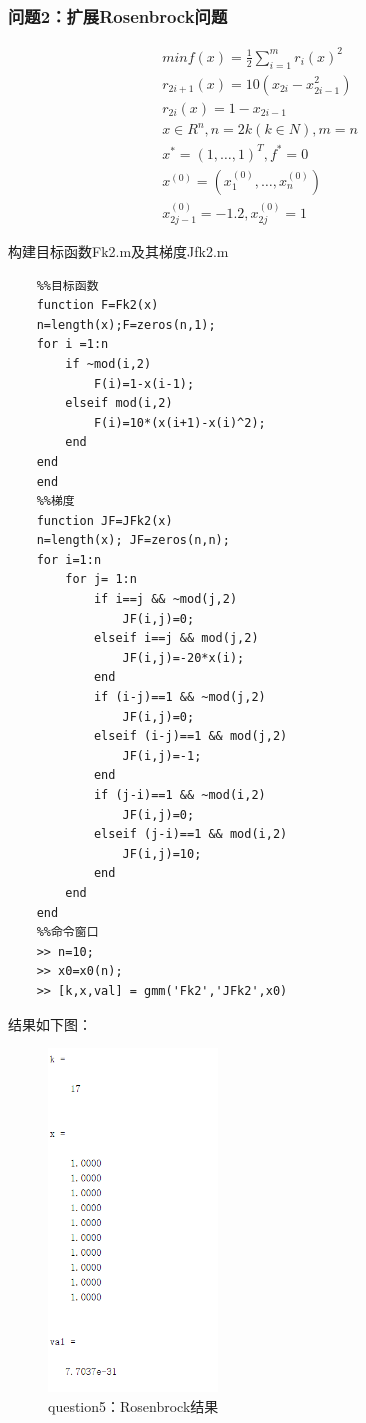\documentclass[12pt]{article} %
\begin{document}
	\subsubsection{问题2：扩展Rosenbrock问题}
	\begin{gather*}
	minf(x)=\frac{1}{2}\sum_{i=1}^{m} r_i(x)^2\\
	r_{2i+1}(x)=10(x_{2i}-x_{2i-1}^2)\\
	r_{2i}(x)=1-x_{2i-1}\\
	x\in R^n,n=2k(k\in N),m=n\\
	x^*=(1,\ldots,1)^T,f^*=0\\
	x^{(0)}=(x_1^{(0)},\ldots,x_n^{(0)})\\
	x_{2j-1}^{(0)}=-1.2,x_{2j}^{(0)}=1
	\end{gather*}
	
	构建目标函数Fk2.m及其梯度Jfk2.m
	\begin{lstlisting}
	%%目标函数
	function F=Fk2(x)
	n=length(x);F=zeros(n,1);
	for i =1:n
		if ~mod(i,2)
			F(i)=1-x(i-1);
		elseif mod(i,2)
			F(i)=10*(x(i+1)-x(i)^2);
		end
	end
	end
	%%梯度
	function JF=JFk2(x)
	n=length(x); JF=zeros(n,n);
	for i=1:n
		for j= 1:n
			if i==j && ~mod(j,2)
				JF(i,j)=0;
			elseif i==j && mod(j,2)
				JF(i,j)=-20*x(i);
			end
			if (i-j)==1 && ~mod(j,2)
				JF(i,j)=0;
			elseif (i-j)==1 && mod(j,2)
				JF(i,j)=-1;
			end
			if (j-i)==1 && ~mod(i,2)
				JF(i,j)=0;
			elseif (j-i)==1 && mod(i,2)
				JF(i,j)=10;
			end
		end
	end
	%%命令窗口
	>> n=10;
	>> x0=x0(n);
	>> [k,x,val] = gmm('Fk2','JFk2',x0)
	\end{lstlisting}
	
	结果如下图：
	\begin{figure}[ht]
		\centering
		\includegraphics[width=0.4\textwidth]{rosen.png}
		\caption{question5：Rosenbrock结果}
		\label{fig:fig1}
	\end{figure}
\end{document}
